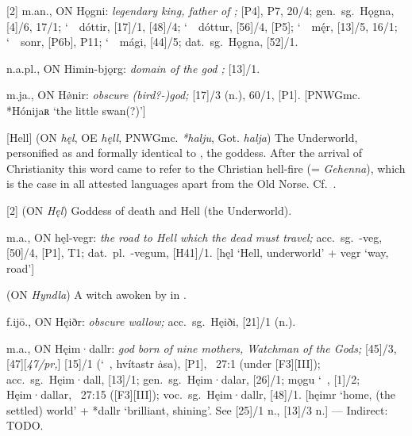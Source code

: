 \begin{itemize}
[2] m.an., ON Hǫgni:
  \emph{legendary king, father of ;} [P4], P7, 20/4;
  gen.~sg.~Hǫgna, [4]/6, 17/1; \char`~\ dóttir, [17]/1, [48]/4; \char`~\ dóttur, [56]/4, [P5]; \char`~\ mę́r, [13]/5, 16/1; \char`~\ sonr, [P6b], P11; \char`~\ mági, [44]/5;
  dat.~sg.~Hǫgna, [52]/1.

 n.a.pl., ON Himin-bjǫrg:
  \emph{domain of the god ;} [13]/1.

 m.ja., ON Hø̇nir:
  \emph{obscure (bird?-)god;} [17]/3 (n.), 60/1, [P1].
  [PNWGmc. *Hónijaʀ ‘the little swan(?)’]

[Hell] (ON \emph{hęl}, OE \emph{hęll}, PNWGmc. \emph{*halju}, Got. \emph{halja})
  The Underworld, personified as and formally identical to , the goddess.  After the arrival of Christianity this word came to refer to the Christian hell-fire (= \emph{Gehenna}), which is the case in all attested languages apart from the Old Norse.  Cf.~.

[2] (ON \emph{Hęl})
  Goddess of death and Hell (the Underworld).

 m.a., ON hęl-vegr:
  \emph{the road to Hell which the dead must travel;} acc.~sg.~-veg, [50]/4, [P1], T1; dat.~pl.~-vegum, [H41]/1.
  [hęl ‘Hell, underworld’ + vegr ‘way, road’]

 (ON \emph{Hyndla})
  A witch awoken by  in .

 f.ijō., ON Hęiðr:
  \emph{obscure wallow;} acc.~sg.~Hęiði, [21]/1 (n.).

 m.a., ON Hęim·dallr:
  \emph{god born of nine mothers, Watchman of the Gods;} [45]/3, [47][\emph{47/pr,}] [15]/1 (\char`~, hvítastr ȧsa), [P1], \Gylfaginning~27:1 (under [F3][III]);
  acc.~sg.~Hęim·dall, [13]/1;
  gen.~sg.~Hęim·dalar, [26]/1; mǫgu \char`~, [1]/2; Hęim·dallar, \Gylfaginning~27:15 ([F3][III]);
  voc.~sg.~Hęim·dallr, [48]/1.
  [hęimr ‘home, (the settled) world’ + *dallr ‘brilliant, shining’.  See [25]/1 n., [13]/3 n.] ---
  Indirect: TODO.


\end{itemize}
